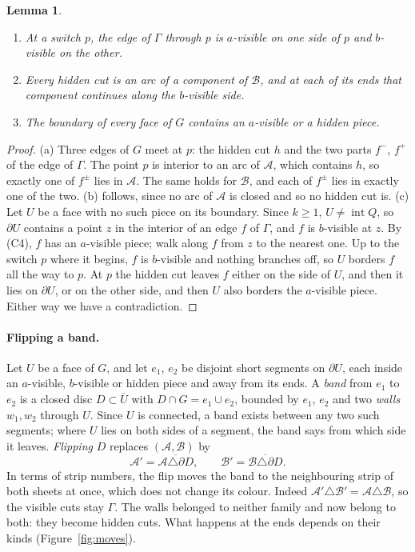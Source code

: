 \documentclass[11pt,a4paper]{article}
\newtheorem{lemma}[theorem]{Lemma}
\theoremstyle{definition}
\theoremstyle{remark}
\newcommand{\A}{\mathcal{A}}
\newcommand{\B}{\mathcal{B}}
\newcommand{\intr}{\operatorname{int}}
\newcommand{\bd}{\partial}
\begin{document}
\begin{lemma}\label{lem:local}
\begin{enumerate}[label=\textup{(\alph*)}]
\item At a switch $p$, the edge of $\Gamma$ through $p$ is $a$-visible on
  one side of $p$ and $b$-visible on the other.
\item Every hidden cut is an arc of a component of $\B$, and at each of its
  ends that component continues along the $b$-visible side.
\item The boundary of every face of $G$ contains an $a$-visible or a hidden
  piece.
\end{enumerate}
\end{lemma}
\begin{proof}
(a) Three edges of $G$ meet at $p$: the hidden cut $h$ and the two parts
$f^-$, $f^+$ of the edge of $\Gamma$. The point $p$ is interior to an arc of
$\A$, which contains $h$, so exactly one of $f^\pm$ lies in $\A$. The same
holds for $\B$, and each of $f^\pm$ lies in exactly one of the two.
(b) follows, since no arc of $\A$ is closed and so no hidden cut is.
(c) Let $U$ be a face with no such piece on its boundary. Since $k\ge 1$,
$U\neq\intr Q$, so $\bd U$ contains a point $z$ in the interior of an edge
$f$ of $\Gamma$, and $f$ is $b$-visible at $z$. By (C4), $f$ has an $a$-visible piece; walk
along $f$ from $z$ to the nearest one. Up to the switch $p$ where it begins,
$f$ is $b$-visible and nothing branches off, so $U$ borders $f$ all the way
to $p$. At $p$ the hidden cut leaves $f$ either on the side of $U$, and then
it lies on $\bd U$, or on the other side, and then $U$ also borders the
$a$-visible piece. Either way we have a contradiction.
\end{proof}

\paragraph{Flipping a band.}
Let $U$ be a face of $G$, and let $e_1$, $e_2$ be disjoint short segments
on $\bd U$, each inside an $a$-visible, $b$-visible or hidden piece and
away from its ends. A \emph{band} from $e_1$ to $e_2$ is a closed disc
$D\subset\overline U$ with $D\cap G=e_1\cup e_2$, bounded by $e_1$, $e_2$
and two \emph{walls} $w_1,w_2$ through $U$. Since $U$ is connected, a band exists between any two such segments; where
$U$ lies on both sides of a segment, the band says from which side it
leaves. \emph{Flipping} $D$ replaces
$(\A,\B)$ by
\[
  \A'=\overline{\A\triangle\bd D},\qquad \B'=\overline{\B\triangle\bd D}.
\]
In terms of strip numbers, the flip moves the band to the neighbouring
strip of both sheets at once, which does not change its colour. Indeed
$\A'\triangle\B'=\A\triangle\B$, so the visible cuts stay $\Gamma$. The
walls belonged to neither family and now belong to both: they become
hidden cuts. What happens at the ends depends on their kinds
(Figure~\ref{fig:moves}).
\end{document}
